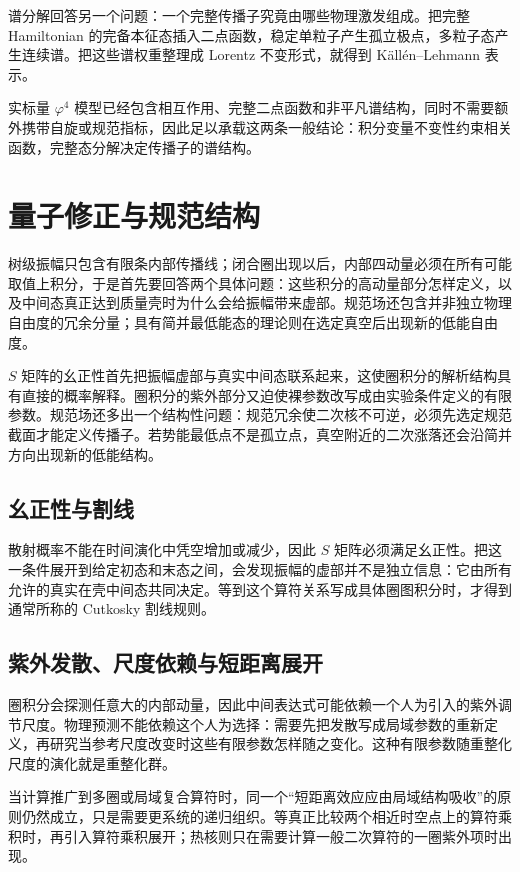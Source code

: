 谱分解回答另一个问题：一个完整传播子究竟由哪些物理激发组成。把完整 Hamiltonian 的完备本征态插入二点函数，稳定单粒子产生孤立极点，多粒子态产生连续谱。把这些谱权重整理成 Lorentz 不变形式，就得到 Källén--Lehmann 表示。

实标量 $\varphi^4$ 模型已经包含相互作用、完整二点函数和非平凡谱结构，同时不需要额外携带自旋或规范指标，因此足以承载这两条一般结论：积分变量不变性约束相关函数，完整态分解决定传播子的谱结构。


\section{量子修正与规范结构}

树级振幅只包含有限条内部传播线；闭合圈出现以后，内部四动量必须在所有可能取值上积分，于是首先要回答两个具体问题：这些积分的高动量部分怎样定义，以及中间态真正达到质量壳时为什么会给振幅带来虚部。规范场还包含并非独立物理自由度的冗余分量；具有简并最低能态的理论则在选定真空后出现新的低能自由度。

$S$ 矩阵的幺正性首先把振幅虚部与真实中间态联系起来，这使圈积分的解析结构具有直接的概率解释。圈积分的紫外部分又迫使裸参数改写成由实验条件定义的有限参数。规范场还多出一个结构性问题：规范冗余使二次核不可逆，必须先选定规范截面才能定义传播子。若势能最低点不是孤立点，真空附近的二次涨落还会沿简并方向出现新的低能结构。

\subsection{幺正性与割线}
散射概率不能在时间演化中凭空增加或减少，因此 $S$ 矩阵必须满足幺正性。把这一条件展开到给定初态和末态之间，会发现振幅的虚部并不是独立信息：它由所有允许的真实在壳中间态共同决定。等到这个算符关系写成具体圈图积分时，才得到通常所称的 Cutkosky 割线规则。



\subsection{紫外发散、尺度依赖与短距离展开}
圈积分会探测任意大的内部动量，因此中间表达式可能依赖一个人为引入的紫外调节尺度。物理预测不能依赖这个人为选择：需要先把发散写成局域参数的重新定义，再研究当参考尺度改变时这些有限参数怎样随之变化。这种有限参数随重整化尺度的演化就是重整化群。

当计算推广到多圈或局域复合算符时，同一个“短距离效应应由局域结构吸收”的原则仍然成立，只是需要更系统的递归组织。等真正比较两个相近时空点上的算符乘积时，再引入算符乘积展开；热核则只在需要计算一般二次算符的一圈紫外项时出现。


